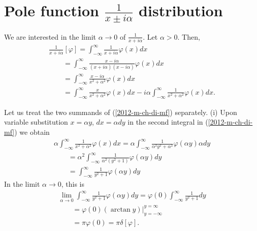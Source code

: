 \section{Pole function $\frac{1}{x\pm i\alpha}$ distribution}

We are interested in the limit $\alpha  \rightarrow 0$ of $\frac{1}{x+i\alpha}$.
Let  $\alpha >0$. Then,
\begin{equation}
\begin{split}
\frac{1}{x+i\alpha} \left[ \varphi \right]
=
\int_{-\infty}^\infty  \frac{1}{x+i\alpha}  \varphi(x) dx
\\
\qquad
=
\int_{-\infty}^\infty   \frac{x-i\alpha}{ (x+i\alpha)(x-i\alpha) }   \varphi(x) dx
\\
\qquad
=
\int_{-\infty}^\infty   \frac{x-i\alpha}{x^2+ \alpha^2}   \varphi(x) dx
\\
\qquad
=
\int_{-\infty}^\infty   \frac{x}{x^2+ \alpha^2}   \varphi(x) dx
-i\alpha \int_{-\infty}^\infty   \frac{1}{x^2+ \alpha^2}   \varphi(x) dx
.
\end{split}
\label{2012-m-ch-di-mf}
\end{equation}

Let us treat the two summands of (\ref{2012-m-ch-di-mf}) separately.
(i) Upon variable substitution  $x = \alpha y$, $dx =\alpha dy$ in the second integral in (\ref{2012-m-ch-di-mf}) we obtain
\begin{equation}
\begin{split}
\alpha \int_{-\infty}^\infty   \frac{1}{x^2+ \alpha^2}   \varphi(x) dx
=
\alpha \int_{-\infty}^\infty   \frac{1}{\alpha^2y^2+ \alpha^2}   \varphi(\alpha y) \alpha dy
\\
\qquad
=
\alpha^2 \int_{-\infty}^\infty   \frac{1}{\alpha^2(y^2+ 1)}   \varphi(\alpha y)   dy
\\
\qquad
=
  \int_{-\infty}^\infty   \frac{1}{  y^2+ 1 }   \varphi(\alpha y)   dy
\end{split}
\end{equation}
In the limit $\alpha  \rightarrow 0$, this is
\begin{equation}
\begin{split}
\lim_{\alpha  \rightarrow 0} \int_{-\infty}^\infty   \frac{1}{  y^2+ 1 }   \varphi(\alpha y)   dy
=
\varphi(0) \int_{-\infty}^\infty   \frac{1}{  y^2+ 1 }       dy
\\
\qquad =
\varphi(0) \left. \left( \arctan y \right) \right|_{y=-\infty}^{y=\infty}
\\
\qquad =
\pi \varphi(0) =
\pi \delta [\varphi ]
.
\end{split}
\end{equation}

